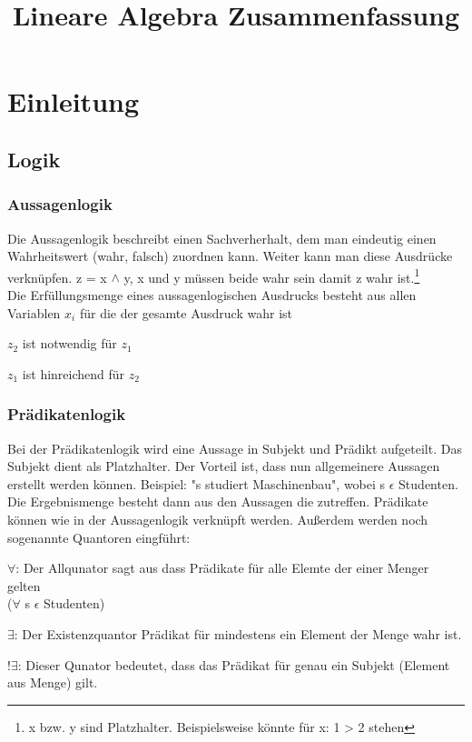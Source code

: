 \documentclass[a4paper,10pt]{scrartcl}
\title{Lineare Algebra Zusammenfassung}
\author{}
\begin{document}
    \maketitle
    \newpage
    \tableofcontents
    \newpage

    \section{Einleitung}
        \subsection{Logik}

        \subsubsection{Aussagenlogik}
        Die Aussagenlogik beschreibt einen Sachverherhalt, dem man eindeutig einen 
        Wahrheitswert (wahr, falsch) zuordnen kann. Weiter kann man diese Ausdrücke verknüpfen. 
        z = x $\wedge$ y, x und y müssen beide wahr sein damit z wahr ist.\footnote{x bzw. y sind Platzhalter. Beispielsweise könnte für x: 1 > 2 stehen} \\
        Die Erfüllungsmenge eines aussagenlogischen Ausdrucks besteht aus allen Variablen $x_i$ für die der gesamte Ausdruck wahr ist
        \begin{description}
            \item[$z_1 \Rightarrow z_2$]
            \item $z_2$ ist notwendig für $z_1$ 
            \item $z_1$ ist hinreichend für $z_2$
        \end{description}

        \subsubsection{Prädikatenlogik}
        Bei der Prädikatenlogik wird eine Aussage in Subjekt und Prädikt aufgeteilt. Das Subjekt dient als Platzhalter. Der Vorteil ist, dass nun 
        allgemeinere Aussagen erstellt werden können. Beispiel: "s studiert Maschinenbau", wobei s $\epsilon$ Studenten. \\
        Die Ergebnismenge besteht dann aus den Aussagen die zutreffen. Prädikate können wie in der Aussagenlogik verknüpft werden. Außerdem werden noch sogenannte
        Quantoren eingführt:
        \begin{description}
            \item $\forall$: Der Allqunator sagt aus dass  Prädikate für alle Elemte der einer Menger gelten \\($\forall$ s $\epsilon$ Studenten)
            \item $\exists$: Der Existenzquantor Prädikat für mindestens ein Element der Menge wahr ist.
            \item $!\exists$: Dieser Qunator bedeutet, dass das Prädikat für genau ein Subjekt (Element aus Menge) gilt.
        \end{description} 
\end{document}
